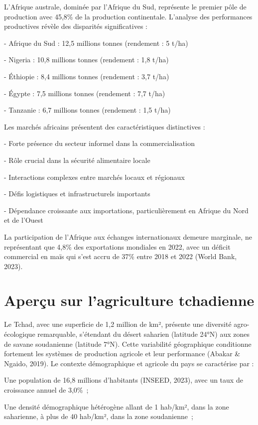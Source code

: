 \documentclass[12pt,oneside]{report}
\begin{document}
L'Afrique australe, dominée par l'Afrique du Sud, représente le premier pôle de production avec 45,8\% de la production continentale. L'analyse des performances productives révèle des disparités significatives :

- Afrique du Sud : 12,5 millions tonnes (rendement : 5 t/ha)

- Nigeria : 10,8 millions tonnes (rendement : 1,8 t/ha)

- Éthiopie : 8,4 millions tonnes (rendement : 3,7 t/ha)

- Égypte : 7,5 millions tonnes (rendement : 7,7 t/ha)

- Tanzanie : 6,7 millions tonnes (rendement : 1,5 t/ha)

Les marchés africains présentent des caractéristiques distinctives :

- Forte présence du secteur informel dans la commercialisation

- Rôle crucial dans la sécurité alimentaire locale

- Interactions complexes entre marchés locaux et régionaux

- Défis logistiques et infrastructurels importants

- Dépendance croissante aux importations, particulièrement en Afrique du Nord et de l'Ouest

La participation de l'Afrique aux échanges internationaux demeure marginale, ne représentant que 4,8\% des exportations mondiales en 2022, avec un déficit commercial en maïs qui s'est accru de 37\% entre 2018 et 2022 (World Bank, 2023).

\section{Aperçu sur l’agriculture tchadienne}
Le Tchad, avec une superficie de 1,2 million de km², présente une diversité agro-écologique remarquable, s'étendant du désert saharien (latitude 24°N) aux zones de savane soudanienne (latitude 7°N). Cette variabilité géographique conditionne fortement les systèmes de production agricole et leur performance (Abakar \& Ngaido, 2019). Le contexte démographique et agricole du pays se caractérise par :

Une population de 16,8 millions d'habitants (INSEED, 2023), avec un taux de croissance annuel de 3,0\% ;

Une densité démographique hétérogène allant de 1 hab/km², dans la zone saharienne, à plus de 40 hab/km², dans la zone soudanienne ;
\end{document}
